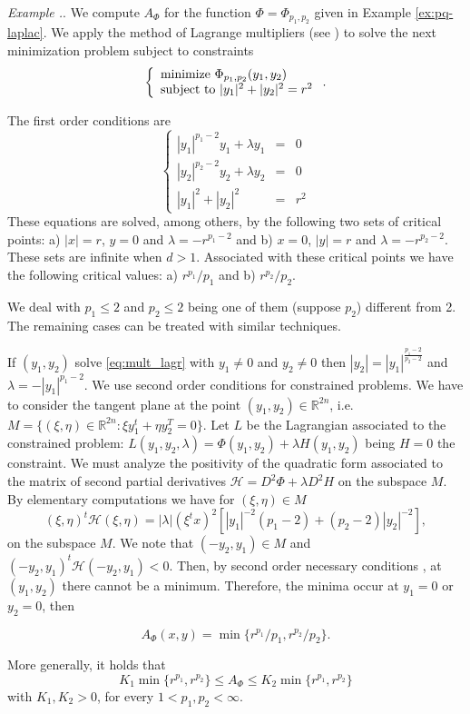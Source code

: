 \documentclass[twoside]{article}
\theoremstyle{remark}
\newcommand{\rr}{\mathbb{R}}
\renewcommand{\leq}{\leqslant}
\newcounter{example}[section]
\newenvironment{example}{\refstepcounter{example}\noindent\textit{Example \arabic{section}.\arabic{example}}.}{ }
\begin{document}
\begin{example} We compute $A_{\Phi}$ for the function $\Phi=\Phi_{p_1,p_2}$ given in Example \eqref{ex:pq-laplac}. We apply the method of Lagrange multipliers (see \cite[Ch. 11]{luenberger2015linear}) to solve the next minimization problem subject to constraints
\[
\left\{ \begin{array}{ll}
  \hbox{minimize } \Phi_{p_1,p_2}(y_1,y_2)\\
	 \hbox{subject to }|y_1|^2+|y_2|^2=r^2\\
        \end{array}
\right.
.\]

The first order conditions  are
\begin{equation}\label{eq:mult_lagr}
\left
\{
\begin{array}{ccc}
|y_1|^{p_1-2}y_1+ \lambda y_1&=&0
\\
|y_2|^{p_2-2}y_2+\lambda y_2&=&0
\\
|y_1|^2+|y_2|^2&=&r^2
\end{array}
\right.
\end{equation}
These equations are solved, among others, by the following two sets  of critical points: 
a) $|x|=r$, $y=0$ and $\lambda=-r^{p_1-2}$ and b) $x=0$, $|y|=r$ and $\lambda=-r^{p_2-2}$. These sets are infinite when $d>1$. 
Associated with these critical points we have the following critical values: a) $r^{p_1}/p_1$ and b) $r^{p_2}/p_2$.

We deal with $p_1\leq 2$ and $p_2\leq 2$ being one of them (suppose $p_2$) different from 2. The remaining cases can be treated with similar techniques. 


If $(y_1,y_2)$ solve \eqref{eq:mult_lagr} with $y_1\neq 0$ and $y_2 \neq 0$ then  $|y_2|=|y_1|^{\frac{p_1-2}{p_2-2}}$ and $\lambda=-|y_1|^{p_1-2}$.  We use second order conditions for constrained problems.
We have to consider  the tangent plane at the point $(y_1,y_2)\in \rr^{2n}$, i.e. 
$M=\{(\xi,\eta) \in \rr^{2n}: \xi y_1^t+\eta y_2^T=0\}$. Let $L$ be the Lagrangian associated to the constrained problem: $L(y_1,y_2,\lambda)=\Phi(y_1,y_2)+\lambda H(y_1,y_2)$ being $H=0$ the constraint. We must analyze the positivity of the quadratic form associated to the matrix  of second partial derivatives $\mathcal{H}=D^2 \Phi+ \lambda D^2 H$ 
on the subspace $M$. By elementary computations we have for $(\xi,\eta)\in M$
\[(\xi,\eta)^t\mathcal{H}(\xi,\eta)=
|\lambda| (\xi^tx)^2 [|y_1|^{-2}(p_1-2)+(p_2-2)|y_2|^{-2}],\]
on the subspace $M$. We note that $(-y_2,y_1)\in M$ and $(-y_2,y_1)^t\mathcal{H}(-y_2,y_1)<0$.
Then, by second order necessary conditions \cite[p.333]{luenberger2015linear}, 
at $(y_1,y_2)$ there cannot be a minimum. Therefore, the minima occur at $y_1=0$ or $y_2=0$, then 

\[A_{\Phi}(x,y)=\min\{r^{p_1}/p_1, r^{p_2}/p_2\}.\] 

More generally, it holds that 
\[
K_1\min\{r^{p_1}, r^{p_2}\}\leq A_{\Phi}\leq K_2\min\{r^{p_1}, r^{p_2}\}
\]
with $K_1,K_2>0$, for every $1<p_1,p_2<\infty$. 
\end{example}
\end{document}
